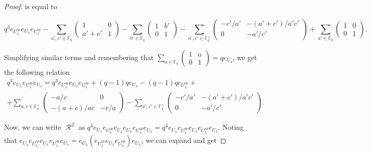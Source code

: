 \documentclass[12pt,reqno]{amsart}
\theoremstyle{definition}
\theoremstyle{remark}
\numberwithin{equation}{section}
\DeclareMathOperator{\R}{\mathcal{R}}
\begin{document}
\begin{proof}
is equal to

\[q^3 e_{U_{\lambda}^{op}}e_{U_{\lambda}}e_{U_{\lambda}^{op}} - \sum_{a', c' \in \mathbb{F}_q} 
\begin{pmatrix}
1 & 0 \\
a'+c' & 1 
\end{pmatrix} - \sum_{b' \in \mathbb{F}_q}
\begin{pmatrix}
1 & b' \\
0 & 1 
\end{pmatrix}
- \sum_{a', c' \in \mathbb{F}_q^{\times}}
\begin{pmatrix}
-c'/a' & -(a'+c')/a'c' \\
0 & -a'/c' 
\end{pmatrix}
+\sum_{a' \in \mathbb{F}_q}
\begin{pmatrix}
1 & 0 \\
0 & 1 
\end{pmatrix}.\]

Simplifying similar terms and remembering that $\sum_{a \in \mathbb{F}_q} \begin{pmatrix}
1 & a \\
0 & 1 
\end{pmatrix} = qe_{U_{\lambda}}$, we get the following relation
\begin{multline*}
    q^3 e_{U_{\lambda}}e_{U_{\lambda}^{op}}e_{U_{\lambda}} = q^3 e_{U_{\lambda}^{op}}e_{U_{\lambda}}e_{U_{\lambda}^{op}} + (q-1) qe_{U_{\lambda}} - (q-1) qe_{U_{\lambda}^{op}} +\\
    +
    \sum_{a, c \in \mathbb{F}_q^{\times}}\begin{pmatrix}
    -a/c & 0 \\
    -(a+c)/ac & -c/a 
    \end{pmatrix}
    - \sum_{a', c' \in \mathbb{F}_q^{\times}}
    \begin{pmatrix}
    -c'/a' & -(a'+c')/a'c' \\
    0 & -a'/c' 
    \end{pmatrix}.
\end{multline*}

Now, we can write $\R^2$ as $ q^4 e_{U_{\lambda}}e_{U_{\lambda}^{op}}e_{U_{\lambda}}e_{U_{\lambda}}e_{U_{\lambda}^{op}}e_{U_{\lambda}}=q^4 e_{U_{\lambda}}e_{U_{\lambda}^{op}}e_{U_{\lambda}}e_{U_{\lambda}^{op}}e_{U_{\lambda}}$. Noting that $e_{U_{\lambda}}e_{U_{\lambda}^{op}}e_{U_{\lambda}}e_{U_{\lambda}^{op}}e_{U_{\lambda}} = e_{U_{\lambda}}(e_{U_{\lambda}^{op}}e_{U_{\lambda}}e_{U_{\lambda}^{op}})e_{U_{\lambda}}$, we can expand and get


\end{proof}
\end{document}
